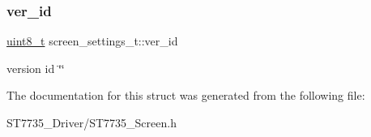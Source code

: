 \subsubsection{\texorpdfstring{ver\+\_\+id}{ver\_id}}
{\footnotesize\ttfamily \hyperlink{vl53l0x__types_8h_aba7bc1797add20fe3efdf37ced1182c5}{uint8\+\_\+t} screen\+\_\+settings\+\_\+t\+::ver\+\_\+id}

version id \char`\"{}\char`\"{} 

The documentation for this struct was generated from the following file\+:\begin{DoxyCompactItemize}
\item 
S\+T7735\+\_\+\+Driver/S\+T7735\+\_\+\+Screen.\+h\end{DoxyCompactItemize}
